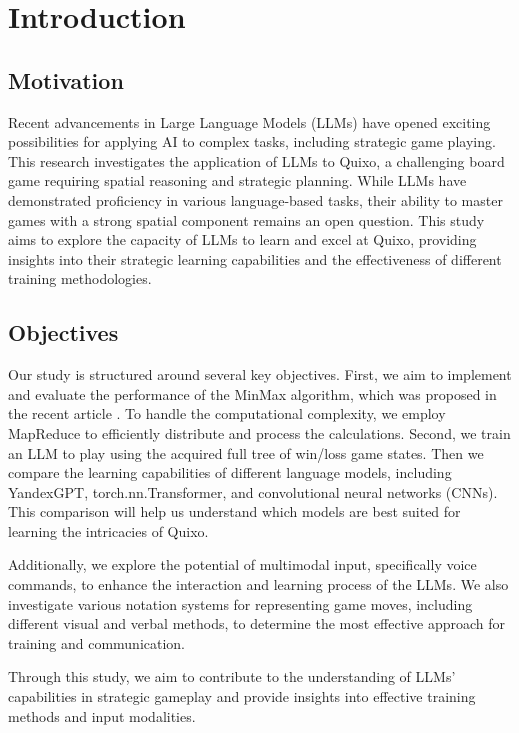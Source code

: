 \chapter{Introduction} \label{chapter1}

 \section{Motivation}  \label{sec:intro}

Recent advancements in Large Language Models (LLMs) have opened exciting possibilities for applying AI to complex tasks, including strategic game playing. This research investigates the application of LLMs to Quixo, a challenging board game requiring spatial reasoning and strategic planning.  While LLMs have demonstrated proficiency in various language-based tasks, their ability to master games with a strong spatial component remains an open question. This study aims to explore the capacity of LLMs to learn and excel at Quixo, providing insights into their strategic learning capabilities and the effectiveness of different training methodologies.

\section{Objectives}  \label{sec:objectives}
Our study is structured around several key objectives.
 First, we aim to implement and evaluate the performance of the MinMax algorithm, which was proposed in the recent article \cite{tanak2020quixo}. 
 To handle the computational complexity, we employ MapReduce to efficiently distribute and process the calculations. Second, we train an LLM to play using the acquired full tree of win/loss game states.
Then we compare the learning capabilities of different language models, including YandexGPT, torch.nn.Transformer, and convolutional neural networks (CNNs). 
 This comparison will help us understand which models are best suited for learning the intricacies of Quixo.

Additionally, we explore the potential of multimodal input, specifically voice commands, to enhance the interaction and learning process of the LLMs. 
We also investigate various notation systems for representing game moves, including different visual and verbal methods, to determine the most effective approach for training and communication.

Through this study, we aim to contribute to the understanding of LLMs' capabilities in strategic gameplay and provide insights into effective training methods and input modalities.

